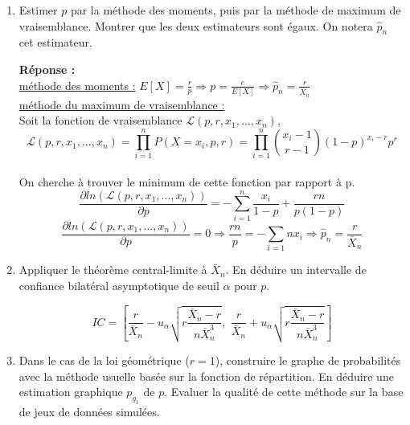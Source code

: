 \documentclass[12pt]{article}
\newcommand{\dsp}{\displaystyle}
\begin{document}
\begin{enumerate}

\renewcommand{\labelenumi}{\arabic{section}.\arabic{enumi}.}

\item Estimer $p$ par la méthode des moments, puis par la méthode de maximum de vraisemblance. Montrer que les deux estimateurs sont égaux. On notera $\hat{p}_n$ cet estimateur.

\textbf{Réponse :\\}
\underline{méthode des moments :} $E[X] = \dsp \frac{r}{p} \Rightarrow p = \frac{e}{E[X]} \Rightarrow \hat{p}_n = \frac{r}{\bar{X}_n} $ \\
\underline{méthode du maximum de vraisemblance :} \\
Soit  la fonction de vraisemblance $\mathcal{L}(p, r, x_{1}, ..., x_{n})$,\\$$\mathcal{L}(p, r, x_{1}, ... , x_{n}) = \prod_{i=1}^{n}P(X=x_{i}, p, r)  = \prod_{i=1}^n \binom{x_i-1}{r-1}(1-p)^{x_i-r}p^r$$ \\
On cherche à trouver le minimum de cette fonction par rapport à p. \\
\[\frac{\partial{ln(\mathcal{L}(p, r, x_{1}, ... , x_{n}))}}{\partial{p}} = -\sum_{i=1}^{n} \frac{x_{i}}{1-p} + \frac{rn}{p(1-p)}\]
\[\frac{\partial{ln(\mathcal{L}(p, r, x_{1}, ... , x_{n}))}}{\partial{p}} = 0 \Rightarrow \frac{rn}{p} = -\sum_{i=1}{n} x_{i} \Rightarrow \hat{p}_n = \frac{r}{\bar{X}_n}\]
\vspace{3mm}

\item Appliquer le théorème central-limite à $\bar{X}_n$. En déduire un intervalle de confiance bilatéral asymptotique de seuil $\alpha$ pour $p$.

$$ IC = \left[ \frac{r}{\bar{X}_n} - u_{\alpha} \sqrt{r\frac{\bar{X}_n - r}{n\bar{X}_n^3}} ,\,\, \frac{r}{\bar{X}_n} + u_{\alpha} \sqrt{r\frac{\bar{X}_n - r}{n\bar{X}_n^3}}  \right] $$

\vspace{3mm}

\item Dans le cas de la loi géométrique ($r=1$), construire le graphe de probabilités avec la méthode usuelle basée sur la fonction de répartition. En déduire une estimation graphique $p_{g_1}$ de $p$. Evaluer la qualité de cette méthode sur la base de jeux de données simulées.


\end{enumerate}
\end{document}
